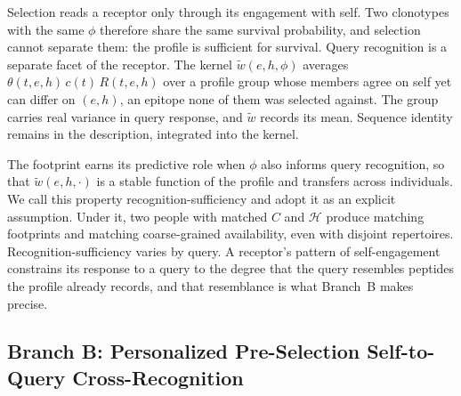 \documentclass[11pt]{article}
\begin{document}
Selection reads a receptor only through its engagement with self. Two clonotypes
with the same \(\phi\) therefore share the same survival probability, and
selection cannot separate them: the profile is sufficient for survival. Query
recognition is a separate facet of the receptor. The kernel
\(\widetilde{w}(e,h,\phi)\) averages \(\theta(t,e,h)\,c(t)\,R(t,e,h)\) over a
profile group whose members agree on self yet can differ on \((e,h)\), an epitope
none of them was selected against. The group carries real variance in query
response, and \(\widetilde{w}\) records its mean. Sequence identity remains in the
description, integrated into the kernel.

The footprint earns its predictive role when \(\phi\) also informs query
recognition, so that \(\widetilde{w}(e,h,\cdot)\) is a stable function of the
profile and transfers across individuals. We call this property
recognition-sufficiency and adopt it as an explicit assumption. Under it, two
people with matched \(C\) and \(\mathcal{H}\) produce matching footprints and
matching coarse-grained availability, even with disjoint repertoires.
Recognition-sufficiency varies by query. A receptor's pattern of self-engagement
constrains its response to a query to the degree that the query resembles
peptides the profile already records, and that resemblance is what Branch~B
makes precise.


\subsection{Branch B: Personalized Pre-Selection Self-to-Query Cross-Recognition}

\end{document}
